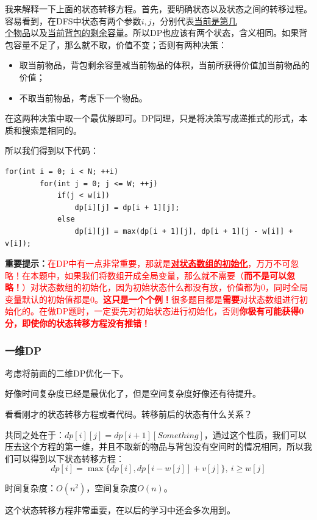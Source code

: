 \documentclass{article}
\theoremstyle{nonumberplain}
\begin{document}
我来解释一下上面的状态转移方程。首先，要明确状态以及状态之间的转移过程。容易看到，在DFS中状态有两个参数$i,j$，分别代表\underline{当前是第几}\\\underline{个物品}以及\underline{当前背包的剩余容量}。所以DP也应该有两个状态，含义相同。如果背包容量不足了，那么就不取，价值不变；否则有两种决策：
\begin{itemize}
	\item{取当前物品，背包剩余容量减当前物品的体积，当前所获得价值加当前物品的价值；}
	\item{不取当前物品，考虑下一个物品。}
\end{itemize}

在这两种决策中取一个最优解即可。DP同理，只是将决策写成递推式的形式，本质和搜索是相同的。

所以我们得到以下代码：

\begin{verbatim}
for(int i = 0; i < N; ++i)
        for(int j = 0; j <= W; ++j)
            if(j < w[i])
                dp[i][j] = dp[i + 1][j];
            else
                dp[i][j] = max(dp[i + 1][j], dp[i + 1][j - w[i]] + v[i]);
\end{verbatim}
\textbf{重要提示：}\textcolor{red}{在DP中有一点非常重要，那就是\underline{\textbf{对状态数组的初始化}}，万万不可忽略！在本题中，如果我们将数组开成全局变量，那么就不需要（\textbf{而不是可以忽略！}）对状态数组的初始化，因为初始状态什么都没有放，价值都为0，同时全局变量默认的初始值都是0。\textbf{这只是一个个例！}很多题目都是\textbf{需要}对状态数组进行初始化的。在做DP题时，一定要先对初始状态进行初始化，否则\textbf{你极有可能获得0分，即使你的状态转移方程没有推错！}}
\subsubsection{一维DP}
考虑将前面的二维DP优化一下。

好像时间复杂度已经是最优化了，但是空间复杂度好像还有待提升。

看看刚才的状态转移方程或者代码。转移前后的状态有什么关系？

共同之处在于：$dp[i][j]=dp[i+1][Something]$，通过这个性质，我们可以压去这个方程的第一维，并且不取新的物品与背包没有空间时的情况相同，所以我们可以得到以下状态转移方程：
\begin{equation*}dp[i]=\max\{dp[i],dp[i-w[j]]+v[j]\},\ i\geq w[j]\end{equation*}

时间复杂度：$O(n^2)$，空间复杂度$O(n)$。

这个状态转移方程非常重要，在以后的学习中还会多次用到。
\end{document}
